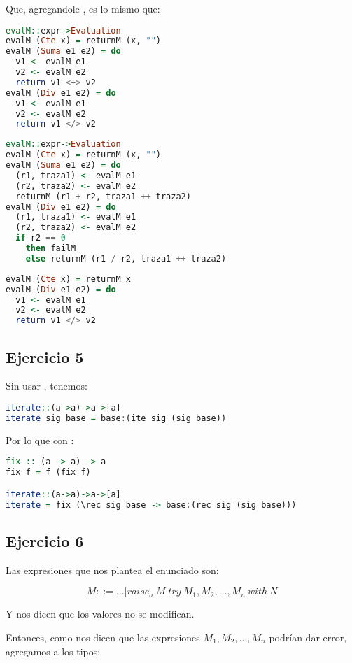 Que, agregandole , es lo mismo que:

\begin{lstlisting}[language=Haskell]
evalM::expr->Evaluation
evalM (Cte x) = returnM (x, "")
evalM (Suma e1 e2) = do
  v1 <- evalM e1
  v2 <- evalM e2
  return v1 <+> v2
evalM (Div e1 e2) = do
  v1 <- evalM e1
  v2 <- evalM e2
  return v1 </> v2
\end{lstlisting}

\begin{lstlisting}[language=Haskell]
evalM::expr->Evaluation
evalM (Cte x) = returnM (x, "")
evalM (Suma e1 e2) = do
  (r1, traza1) <- evalM e1
  (r2, traza2) <- evalM e2
  returnM (r1 + r2, traza1 ++ traza2)
evalM (Div e1 e2) = do
  (r1, traza1) <- evalM e1
  (r2, traza2) <- evalM e2
  if r2 == 0
    then failM
    else returnM (r1 / r2, traza1 ++ traza2)
\end{lstlisting}

\begin{lstlisting}[language=Haskell]
evalM (Cte x) = returnM x
evalM (Div e1 e2) = do
  v1 <- evalM e1
  v2 <- evalM e2
  return v1 </> v2
\end{lstlisting}

\subsection*{Ejercicio 5} Sin usar , tenemos:
\begin{lstlisting}[language=Haskell]
iterate::(a->a)->a->[a]
iterate sig base = base:(ite sig (sig base))
\end{lstlisting}

Por lo que con :
\begin{lstlisting}[language=Haskell]
fix :: (a -> a) -> a
fix f = f (fix f)

iterate::(a->a)->a->[a]
iterate = fix (\rec sig base -> base:(rec sig (sig base)))
\end{lstlisting}

\subsection*{Ejercicio 6}
Las expresiones que nos plantea el enunciado son:

\[M ::= \dots \vert raise_\sigma\ M \vert try\ M_1, M_2, \dots, M_n\ with\ N\]

Y nos dicen que los valores no se modifican.

Entonces, como nos dicen que las expresiones $M_1, M_2, \dots, M_n$ podrían dar error, agregamos a los tipos:

